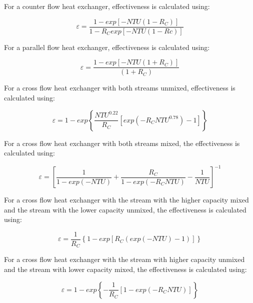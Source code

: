 For a counter flow heat exchanger, effectiveness is calculated using:

\begin{equation}
\varepsilon  = \frac{{1 - exp\left[ { - NTU\left( {1 - {R_C}} \right)} \right]}}{{1 - {R_C}exp\left[ { - NTU\left( {1 - Rc} \right)} \right]}}
\end{equation}

For a parallel flow heat exchanger, effectiveness is calculated using:

\begin{equation}
\varepsilon  = \frac{{1 - exp\left[ { - NTU\left( {1 + {R_C}} \right)} \right]}}{{\left( {1 + {R_C}} \right)}}
\end{equation}

For a cross flow heat exchanger with both streams unmixed, effectiveness is calculated using:

\begin{equation}
\varepsilon  = 1 - exp\left\{ {\frac{{NT{U^{0.22}}}}{{{R_C}}}\left[ {exp\left( { - {R_C}NT{U^{0.78}}} \right) - 1} \right]} \right\}
\end{equation}

For a cross flow heat exchanger with both streams mixed, the effectiveness is calculated using:

\begin{equation}
\varepsilon  = {\left[ {\frac{1}{{1 - exp\left( { - NTU} \right)}} + \frac{{{R_C}}}{{1 - exp\left( { - {R_C}NTU} \right)}} - \frac{1}{{NTU}}} \right]^{ - 1}}
\end{equation}

For a cross flow heat exchanger with the stream with the higher capacity mixed and the stream with the lower capacity unmixed, the effectiveness is calculated using:

\begin{equation}
\varepsilon  = \frac{1}{{{R_C}}}\left\{ {1 - exp\left[ {{R_C}\left( {exp\left( { - NTU} \right) - 1} \right)} \right]} \right\}
\end{equation}

For a cross flow heat exchanger with the stream with higher capacity unmixed and the stream with lower capacity mixed, the effectiveness is calculated using:

\begin{equation}
\varepsilon  = 1 - exp\left\{ { - \frac{1}{{{R_C}}}\left[ {1 - exp\left( { - {R_C}NTU} \right)} \right]} \right\}
\end{equation}

